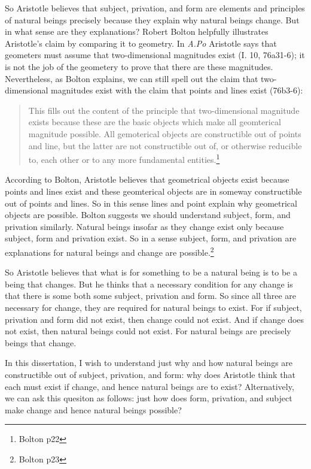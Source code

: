 \documentclass[10pt, oneside]{book}
\begin{document}
So Aristotle believes that subject, privation, and form are elements and principles of natural beings precisely because they explain why natural beings change. But in what sense are they explanations? Robert Bolton helpfully illustrates Aristotle's claim by comparing it to geometry. In \emph{A.Po} Aristotle says that geometers must assume that two-dimensional magnitudes exist (I. 10, 76a31-6); it is not the job of the geometery to prove that there are these magnitudes. Nevertheless, as Bolton explains, we can still spell out the claim that two-dimensional magnitudes exist with the claim that points and lines exist (76b3-6):

\begin{quote} 
This fills out the content of the principle that two-dimensional magnitude exists because these are the basic objects which make all geomterical magnitude possible. All gemoterical objects are constructible out of points and line, but the latter are not constructible out of, or otherwise reducible to, each other or to any more fundamental entities.\footnote{Bolton p22}
\end{quote}
According to Bolton, Aristotle believes that geometrical objects exist because points and lines exist and these geomterical objects are in someway constructible out of points and lines. So in this sense lines and point explain why geometrical objects are possible. Bolton suggests we should understand subject, form, and privation similarly. Natural beings insofar as they change exist only because subject, form and privation exist. So in a sense subject, form, and privation are explanations for natural beings and change are possible.\footnote{Bolton p23} 

So Aristotle believes that what is for something to be a natural being is to be a being that changes. But he thinks that a necessary condition for any change is that there is some both some subject, privation and form. So since all three are necessary for change, they are required for natural beings to exist. For if subject, privation and form did not exist, then change could not exist. And if change does not exist, then natural beings could not exist. For natural beings are precisely beings that change. 

In this dissertation, I wish to understand just why and how natural beings are constructible out of subject, privation, and form: why does Aristotle think that each must exist if change, and hence natural beings are to exist? Alternatively, we can ask this quesiton as follows: just how does form, privation, and subject make change and hence natural beings possible? 
\end{document}
